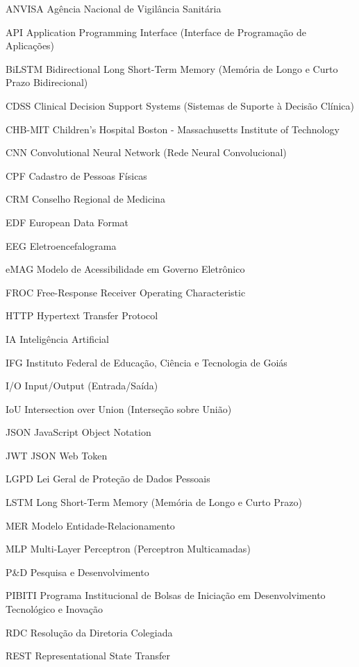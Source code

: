 \begin{siglas}
\item[ANVISA] Agência Nacional de Vigilância Sanitária
\item[API] Application Programming Interface (Interface de Programação de Aplicações)
\item[BiLSTM] Bidirectional Long Short-Term Memory (Memória de Longo e Curto Prazo Bidirecional)
\item[CDSS] Clinical Decision Support Systems (Sistemas de Suporte à Decisão Clínica)
\item[CHB-MIT] Children's Hospital Boston - Massachusetts Institute of Technology
\item[CNN] Convolutional Neural Network (Rede Neural Convolucional)
\item[CPF] Cadastro de Pessoas Físicas
\item[CRM] Conselho Regional de Medicina
\item[EDF] European Data Format
\item[EEG] Eletroencefalograma
\item[eMAG] Modelo de Acessibilidade em Governo Eletrônico
\item[FROC] Free-Response Receiver Operating Characteristic
\item[HTTP] Hypertext Transfer Protocol
\item[IA] Inteligência Artificial
\item[IFG] Instituto Federal de Educação, Ciência e Tecnologia de Goiás
\item[I/O] Input/Output (Entrada/Saída)
\item[IoU] Intersection over Union (Interseção sobre União)
\item[JSON] JavaScript Object Notation
\item[JWT] JSON Web Token
\item[LGPD] Lei Geral de Proteção de Dados Pessoais
\item[LSTM] Long Short-Term Memory (Memória de Longo e Curto Prazo)
\item[MER] Modelo Entidade-Relacionamento
\item[MLP] Multi-Layer Perceptron (Perceptron Multicamadas)
\item[P\&D] Pesquisa e Desenvolvimento
\item[PIBITI] Programa Institucional de Bolsas de Iniciação em Desenvolvimento Tecnológico e Inovação
\item[RDC] Resolução da Diretoria Colegiada
\item[REST] Representational State Transfer

\end{siglas}
